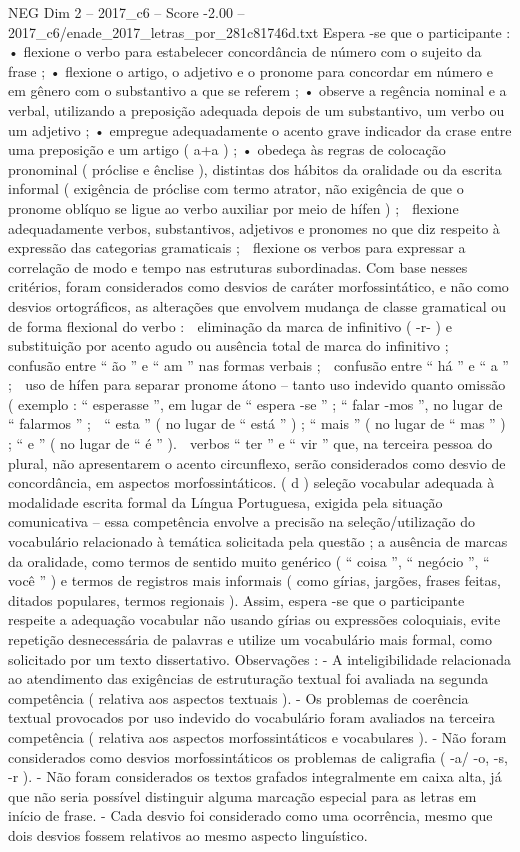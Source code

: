 \begin{textsample}{NEG Dim 2 – 2017\_c6 – Score -2.00 – 2017\_c6/enade\_2017\_letras\_por\_281c81746d.txt}
Espera -se que o participante : • flexione o verbo para estabelecer concordância de número com o sujeito da frase ; • flexione o artigo, o adjetivo e o pronome para concordar em número e em gênero com o substantivo a que se referem ; • observe a regência nominal e a verbal, utilizando a preposição adequada depois de um substantivo, um verbo ou um adjetivo ; • empregue adequadamente o acento grave indicador da crase entre uma preposição e um artigo ( a+a ) ; • obedeça às regras de colocação pronominal ( próclise e ênclise ), distintas dos hábitos da oralidade ou da escrita informal ( exigência de próclise com termo atrator, não exigência de que o pronome oblíquo se ligue ao verbo auxiliar por meio de hífen ) ;  flexione adequadamente verbos, substantivos, adjetivos e pronomes no que diz respeito à expressão das categorias gramaticais ;  flexione os verbos para expressar a correlação de modo e tempo nas estruturas subordinadas.
Com base nesses critérios, foram considerados como desvios de caráter morfossintático, e não como desvios ortográficos, as alterações que envolvem mudança de classe gramatical ou de forma flexional do verbo :  eliminação da marca de infinitivo ( -r- ) e substituição por acento agudo ou ausência total de marca do infinitivo ;  confusão entre “ ão ” e “ am ” nas formas verbais ;  confusão entre “ há ” e “ a ” ;  uso de hífen para separar pronome átono – tanto uso indevido quanto omissão ( exemplo : “ esperasse ”, em lugar de “ espera -se ” ; “ falar -mos ”, no lugar de “ falarmos ” ;  “ esta ” ( no lugar de “ está ” ) ; “ mais ” ( no lugar de “ mas ” ) ; “ e ” ( no lugar de “ é ” ).  verbos “ ter ” e “ vir ” que, na terceira pessoa do plural, não apresentarem o acento circunflexo, serão considerados como desvio de concordância, em aspectos morfossintáticos. ( d ) seleção vocabular adequada à modalidade escrita formal da Língua Portuguesa, exigida pela situação comunicativa – essa competência envolve a precisão na seleção/utilização do vocabulário relacionado à temática solicitada pela questão ; a ausência de marcas da oralidade, como termos de sentido muito genérico ( “ coisa ”, “ negócio ”, “ você ” ) e termos de registros mais informais ( como gírias, jargões, frases feitas, ditados populares, termos regionais ).
Assim, espera -se que o participante respeite a adequação vocabular não usando gírias ou expressões coloquiais, evite repetição desnecessária de palavras e utilize um vocabulário mais formal, como solicitado por um texto dissertativo.
Observações : - A inteligibilidade relacionada ao atendimento das exigências de estruturação textual foi avaliada na segunda competência ( relativa aos aspectos textuais ). - Os problemas de coerência textual provocados por uso indevido do vocabulário foram avaliados na terceira competência ( relativa aos aspectos morfossintáticos e vocabulares ). - Não foram considerados como desvios morfossintáticos os problemas de caligrafia ( -a/ -o, -s, -r ). - Não foram considerados os textos grafados integralmente em caixa alta, já que não seria possível distinguir alguma marcação especial para as letras em início de frase. - Cada desvio foi considerado como uma ocorrência, mesmo que dois desvios fossem relativos ao mesmo aspecto linguístico.

\end{textsample}
